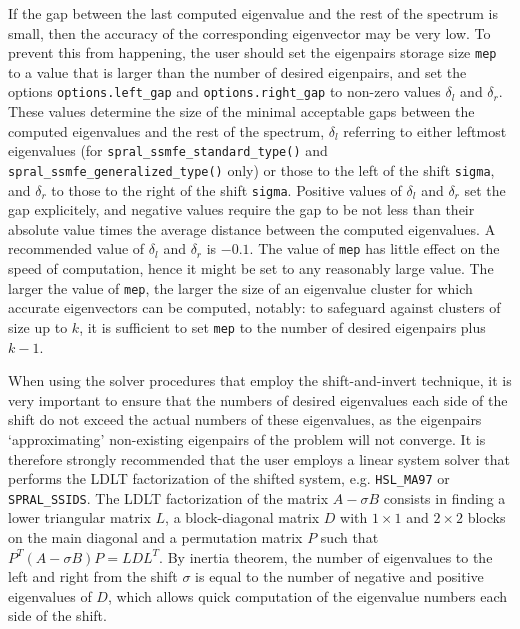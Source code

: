 If the gap %
between the last computed eigenvalue 
and the rest of the spectrum is small,
then the accuracy of the corresponding eigenvector may be very low.
To prevent this from happening,
the user should set the eigenpairs storage size {\tt mep}
to a value that is larger than the number of desired eigenpairs,
and set the options 
{\tt options.left\_gap}
and
{\tt options.right\_gap}
to non-zero values $\delta_l$ and $\delta_r$.
These values
determine the size of the minimal acceptable gaps
between the computed eigenvalues and the rest of the spectrum,
$\delta_l$ referring to either leftmost eigenvalues
(for {\tt spral\_ssmfe\_standard\_\texttt{type}()} and
{\tt spral\_ssmfe\_generalized\_\texttt{type}()} only)
or those to the left of the shift {\tt sigma},
and $\delta_r$
to those to the right of the shift {\tt sigma}.
Positive values of $\delta_l$ and $\delta_r$
set the gap explicitely,
and negative values
require the gap to be not less than their absolute value times
the average distance between the computed eigenvalues.
A recommended value of $\delta_l$ and $\delta_r$ is $-0.1$.
The value of {\tt mep} %
has little effect on
the speed of computation,
hence it might be set to any reasonably large value.
The larger the value of {\tt mep}, 
the larger the size of an eigenvalue cluster
for which accurate eigenvectors can be computed, notably:
to safeguard against clusters of size up to $k$,
it is sufficient to set {\tt mep} to the number of desired eigenpairs
plus $k - 1$.

When using the solver procedures that employ the shift-and-invert technique,
it is very important to ensure that the numbers of desired eigenvalues
each side of the shift do not exceed the actual numbers of these eigenvalues,
as the eigenpairs `approximating' non-existing eigenpairs of the problem
will not converge.
It is therefore strongly recommended that the user employs 
a linear system solver that performs
the LDLT
factorization of %
the shifted system,
e.g. {\tt HSL\_MA97} or {\tt SPRAL\_SSIDS}.
The LDLT factorization of the matrix
$A - \sigma B$ consists in finding a lower triangular
matrix $L$, a block-diagonal matrix $D$
with $1\times 1$ and $2\times 2$ blocks on the main diagonal
and a permutation matrix $P$
such that $P^T(A - \sigma B)P = L D L^T$.
By inertia theorem,
the number of eigenvalues to the left and right from 
the shift $\sigma$
is equal to the number of negative and positive eigenvalues of $D$,
which allows quick computation of the eigenvalue numbers
each side of the shift.

